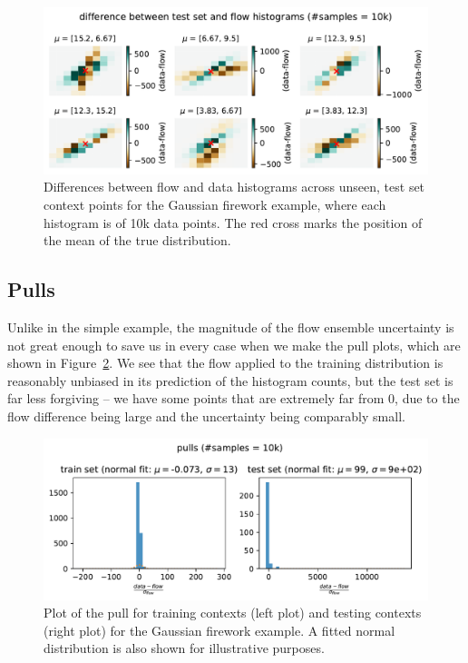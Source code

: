 \documentclass[
  11pt,
  numbers=noendperiod]{book}
\begin{document}
\begin{figure}

{\centering \includegraphics{./images/flows/complex/non-simplehistdifftest-errors.pdf}

}

\caption{\label{fig-complex-hists-test}Differences between flow and data
histograms across unseen, test set context points for the Gaussian
firework example, where each histogram is of 10k data points. The red
cross marks the position of the mean of the true distribution.}

\end{figure}

\hypertarget{pulls-1}{%
\subsection{Pulls}\label{pulls-1}}

Unlike in the simple example, the magnitude of the flow ensemble
uncertainty is not great enough to save us in every case when we make
the pull plots, which are shown in Figure~\ref{fig-complex-pulls}. We
see that the flow applied to the training distribution is reasonably
unbiased in its prediction of the histogram counts, but the test set is
far less forgiving -- we have some points that are extremely far from 0,
due to the flow difference being large and the uncertainty being
comparably small.

\begin{figure}

{\centering \includegraphics{./images/flows/complex/non-simpleflowpulls.pdf}

}

\caption{\label{fig-complex-pulls}Plot of the pull for training contexts
(left plot) and testing contexts (right plot) for the Gaussian firework
example. A fitted normal distribution is also shown for illustrative
purposes.}

\end{figure}
\end{document}
